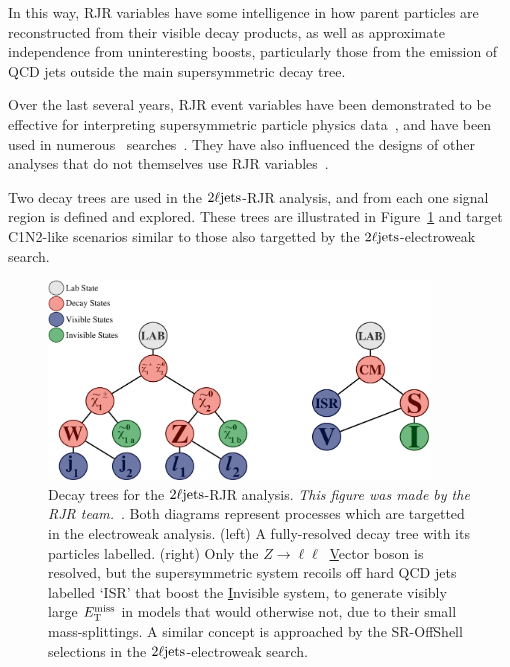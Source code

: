 In this way, RJR variables have some intelligence in how parent particles are
reconstructed from their visible decay products, as well as approximate
independence from uninteresting boosts, particularly those from the emission of
QCD jets outside the main supersymmetric decay tree.

Over the last several years, RJR event variables have been demonstrated to be
effective for interpreting supersymmetric particle physics
data~\cite{santoni2018probing},
and have been used in numerous \atlas\ searches~\cite{
atlas_rjr_SUSY_2016_07,
atlas_rjr_SUSY_2016_15,
atlas_rjr_SUSY_2016_16,
atlas_rjr_23l_SUSY_2017_03,
atlas_rjr_SUSY_2018_12,
atlas_rjr_EXOT_2019_19,
atlas_rjr_3l_SUSY_2019_09
}.
They have also influenced the designs of other analyses that do not themselves
use RJR variables~\cite{atlas_rjr_mimic_SUSY_2018_06}.

Two decay trees are used in the $\twoljets$-RJR analysis, and from each
one signal region is defined and explored.
These trees are illustrated in Figure~\ref{fig:2ljets_rjr_decay_trees} and
target C1N2-like scenarios similar to those also targetted by the
$\twoljets$-electroweak search.

\begin{figure}[tp]
\centering
\includegraphics[width=0.9\textwidth]{figures/2ljets_rjr_trees.pdf}
\caption[
Decay trees for the $\twoljets$-RJR analysis
]{%
Decay trees for the $\twoljets$-RJR analysis.
\emph{This figure was made by the RJR team.}~\cite{atlas2022searches}.
Both diagrams represent processes which are targetted in the electroweak
analysis.
(left) A fully-resolved decay tree with its particles labelled.
(right) Only the $Z\to\ell\ell~$ \underline{V}ector boson
is resolved, but the supersymmetric system recoils off
hard QCD jets labelled `ISR' that boost the \underline{I}nvisible system,
to generate visibly large $E_\mathrm{T}^\mathrm{miss}$ in models that would otherwise not,
due to their small mass-splittings.
A similar concept is approached by the SR-OffShell selections in the
$\twoljets$-electroweak search.
}
\label{fig:2ljets_rjr_decay_trees}
\end{figure}


